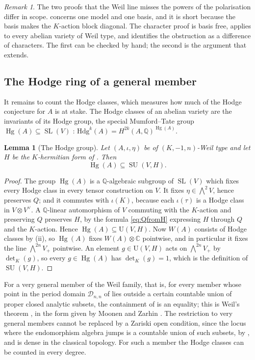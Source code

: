 \documentclass[11pt,reqno]{amsart}
\theoremstyle{plain}
\newtheorem{lemma}[theorem]{Lemma}
\theoremstyle{definition}
\theoremstyle{remark}
\newtheorem{remark}[theorem]{Remark}
\newcommand{\QQ}{\mathbb{Q}}
\newcommand{\CC}{\mathbb{C}}
\newcommand{\cD}{\mathcal{D}}
\newcommand{\Hdg}{\mathrm{Hdg}}
\newcommand{\HW}{W}                      %
\DeclareMathOperator{\Hg}{Hg}
\DeclareMathOperator{\SL}{SL}
\DeclareMathOperator{\SU}{SU}
\begin{document}
\begin{remark}\label{rem:twoproofs}
The two proofs that the Weil line misses the powers of the polarisation
differ in scope.  concerns one model and one basis, and it
is short because the basis makes the $K$-action block diagonal. The
character proof is basis free, applies to every abelian variety of Weil type,
and identifies the obstruction as a difference of characters. The first can
be checked by hand; the second is the argument that 
extends.
\end{remark}

\subsection{The Hodge ring of a general member}

It remains to count the Hodge classes, which measures how much of the Hodge
conjecture for $A$ is at stake. The Hodge classes of an abelian variety are
the invariants of its Hodge group, the special Mumford--Tate group
$\Hg(A)\subseteq\SL(V)$ \cite{Del82}:
$\Hdg^{k}(A)=H^{2k}(A,\QQ)^{\Hg(A)}$.

\begin{lemma}[The Hodge group]%
\label{lem:HgSU}
Let $(A,\iota,\eta)$ be of $(K,-1,n)$-Weil type and let $H$ be the
$K$-hermitian form of . Then
\[
  \Hg(A)\subseteq\SU(V,H) .
\]
\end{lemma}

\begin{proof}
The group $\Hg(A)$ is a $\QQ$-algebraic subgroup of $\SL(V)$ which fixes
every Hodge class in every tensor construction on $V$. It fixes
$\eta\in\bigwedge^{2}V$, hence preserves $Q$; and it commutes with $\iota(K)$,
because each $\iota(\tau)$ is a Hodge class in $V\otimes V^{\vee}$. A
$\QQ$-linear automorphism of $V$ commuting with the $K$-action and preserving
$Q$ preserves $H$, by the formula \eqref{eq:QfromH} expressing $H$ through $Q$
and the $K$-action. Hence $\Hg(A)\subseteq\mathrm{U}(V,H)$. Now
$\HW(A)$ consists of Hodge classes by (ii), so $\Hg(A)$
fixes $\HW(A)\otimes\CC$ pointwise, and in particular it fixes the line
$\bigwedge^{2n}V_{+}$ pointwise. An element $g\in\mathrm{U}(V,H)$ acts on
$\bigwedge^{2n}V_{+}$ by $\det_{K}(g)$,
so every $g\in\Hg(A)$ has $\det_{K}(g)=1$, which is the definition of
$\SU(V,H)$.
\end{proof}

For a very general member of the Weil family, that is, for every member whose
point in the period domain $\cD_{n,n}$ of  lies outside
a certain countable union of proper closed analytic subsets, the containment
of  is an equality; this is Weil's theorem \cite{Weil77}, in the
form given by Moonen and Zarhin \cite{MZ99}. The restriction to very general
members cannot be replaced by a Zariski open condition, since the locus where
the endomorphism algebra jumps is a countable union of such subsets, by
, and is dense in the classical topology. For such a member the
Hodge classes can be counted in every degree.
\end{document}
